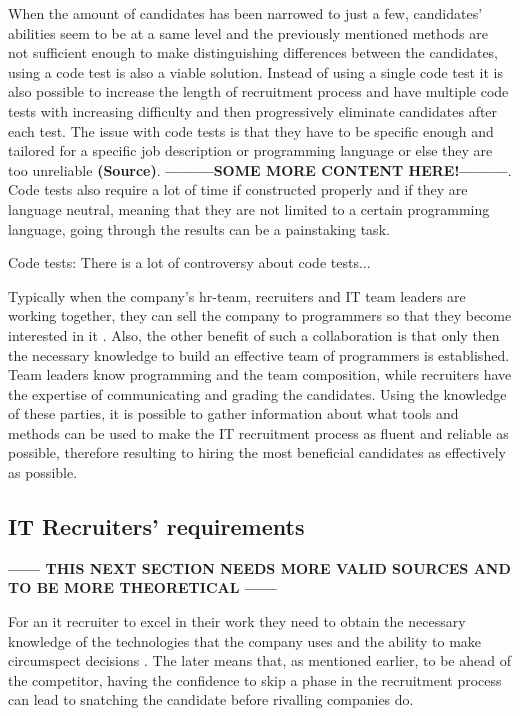 \documentclass[11pt,a4paper,oneside,article]{memoir}
\begin{document}
When the amount of candidates has been narrowed to just a few, candidates' abilities seem to be at a same level and the previously mentioned methods are not sufficient enough to make distinguishing differences between the candidates, using a code test is also a viable solution. Instead of using a single code test it is also possible to increase the length of recruitment process and have multiple code tests with increasing difficulty and then progressively eliminate candidates after each test. The issue with code tests is that they have to be specific enough and tailored for a specific job description or programming language or else they are too unreliable \textbf{(Source)}. \textbf{---------SOME MORE CONTENT HERE!---------}. Code tests also require a lot of time if constructed properly and if they are language neutral, meaning that they are not limited to a certain programming language, going through the results can be a painstaking task.

Code tests:
There is a lot of controversy about code tests...

Typically when the company's \gls{hr}-team, recruiters and IT team leaders are working together, they can sell the company to programmers so that they become interested in it \cite[p.~49, p.~59]{mcculler:book}. Also, the other benefit of such a collaboration is that only then the necessary knowledge to build an effective team of programmers is established. Team leaders know programming and the team composition, while recruiters have the expertise of communicating and grading the candidates. Using the knowledge of these parties, it is possible to gather information about what tools and methods can be used to make the IT recruitment process as fluent and reliable as possible, therefore resulting to hiring the most beneficial candidates as effectively as possible.

\subsection{IT Recruiters' requirements}

\textbf{------ THIS NEXT SECTION NEEDS MORE VALID SOURCES AND TO BE MORE THEORETICAL ------}

For an \gls{it} recruiter to excel in their work they need to obtain the necessary knowledge of the technologies that the company uses and the ability to make circumspect decisions \cite{noora:conversation}. The later means that, as mentioned earlier, to be ahead of the competitor, having the confidence to skip a phase in the recruitment process can lead to snatching the candidate before rivalling companies do.
\end{document}
